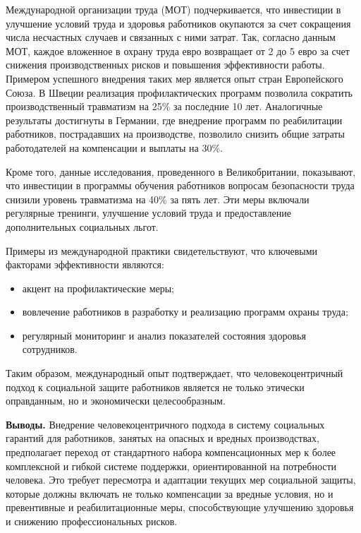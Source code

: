 \begin{multicols}{2}
Международной организации труда (МОТ) подчеркивается, что инвестиции в
улучшение условий труда и здоровья работников окупаются за счет
сокращения числа несчастных случаев и связанных с ними затрат. Так,
согласно данным МОТ, каждое вложенное в охрану труда евро возвращает от
2 до 5 евро за счет снижения производственных рисков и повышения
эффективности работы\hspace{0pt}\hspace{0pt}. Примером успешного
внедрения таких мер является опыт стран Европейского Союза. В Швеции
реализация профилактических программ позволила сократить
производственный травматизм на 25\% за последние 10 лет. Аналогичные
результаты достигнуты в Германии, где внедрение программ по реабилитации
работников, пострадавших на производстве, позволило снизить общие
затраты работодателей на компенсации и выплаты на
30\%\hspace{0pt}\hspace{0pt}.

Кроме того, данные исследования, проведенного в Великобритании,
показывают, что инвестиции в программы обучения работников вопросам
безопасности труда снизили уровень травматизма на 40\% за пять лет. Эти
меры включали регулярные тренинги, улучшение условий труда и
предоставление дополнительных социальных льгот\hspace{0pt}.

Примеры из международной практики свидетельствуют, что ключевыми
факторами эффективности являются:

\begin{itemize}
\item
  акцент на профилактические меры;
\item
  вовлечение работников в разработку и реализацию программ охраны труда;
\item
  регулярный мониторинг и анализ показателей состояния здоровья
  сотрудников.
\end{itemize}

Таким образом, международный опыт подтверждает, что человекоцентричный
подход к социальной защите работников является не только этически
оправданным, но и экономически целесообразным.

{\bfseries Выводы.} Внедрение человекоцентричного подхода в систему
социальных гарантий для работников, занятых на опасных и вредных
производствах, предполагает переход от стандартного набора
компенсационных мер к более комплексной и гибкой системе поддержки,
ориентированной на потребности человека. Это требует пересмотра и
адаптации текущих мер социальной защиты, которые должны включать не
только компенсации за вредные условия, но и превентивные и
реабилитационные меры, способствующие улучшению здоровья и снижению
профессиональных рисков.


\end{multicols}
